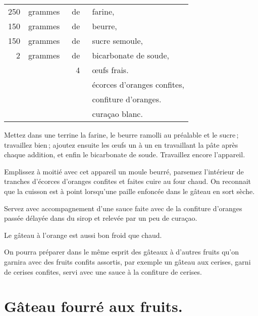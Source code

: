 \footnotesize
\begin{longtable}{rrrp{16em}}
    250 & grammes & de & farine,                                                                          \\
    150 & grammes & de & beurre,                                                                          \\
    150 & grammes & de & sucre semoule,                                                                   \\
      2 & grammes & de & bicarbonate de soude,                                                            \\
        &         &  4 & œufs frais.                                                                      \\
        &         &    & écorces d'oranges confites,                                                      \\
        &         &    & confiture d'oranges.                                                             \\
        &         &    & curaçao blanc.                                                                   \\
\end{longtable}
\normalsize

Mettez dans une terrine la farine, le beurre ramolli au préalable et le sucre ;
travaillez bien ; ajoutez ensuite les œufs un à un en travaillant la pâte après chaque
addition, et enfin le bicarbonate de soude. Travaillez encore l'appareil.

Emplissez à moitié avec cet appareil un moule beurré, parsemez l'intérieur de
tranches d'écorces d'oranges confites et faites cuire au four chaud. On
reconnait que la cuisson est à point lorsqu'une paille enfoncée dans le gâteau
en sort sèche.

Servez avec accompagnement d'une sauce faite avec de la confiture d'oranges
passée délayée dans du sirop et relevée par un peu de curaçao.

Le gâteau à l'orange est aussi bon froid que chaud.

\sk

On pourra préparer dans le même esprit des gâteaux à d'autres fruits qu'on
garnira avec des fruits confits assortis, par exemple un gâteau aux cerises,
garni de cerises confites, servi avec une sauce à la confiture de cerises.

\section*{\centering Gâteau fourré aux fruits.}
{}

